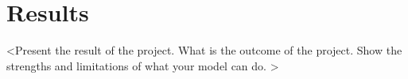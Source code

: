 \section{Results}
\label{sec:results}
<Present the result of the project. What is the outcome of the project. Show the strengths and limitations of what your model can do. >